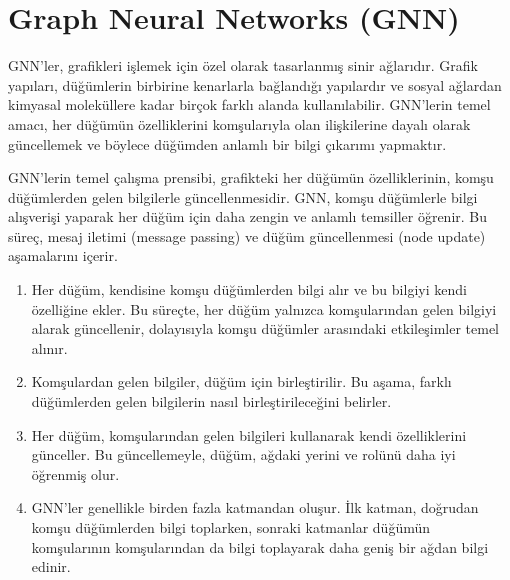 \section{Graph Neural Networks (GNN)}

GNN’ler, grafikleri işlemek için özel olarak tasarlanmış sinir ağlarıdır. Grafik yapıları, düğümlerin birbirine kenarlarla bağlandığı yapılardır ve sosyal ağlardan kimyasal moleküllere kadar birçok farklı alanda kullanılabilir. GNN’lerin temel amacı, her düğümün özelliklerini komşularıyla olan ilişkilerine dayalı olarak güncellemek ve böylece düğümden anlamlı bir bilgi çıkarımı yapmaktır.

GNN'lerin temel çalışma prensibi, grafikteki her düğümün özelliklerinin, komşu düğümlerden gelen bilgilerle güncellenmesidir. GNN, komşu düğümlerle bilgi alışverişi yaparak her düğüm için daha zengin ve anlamlı temsiller öğrenir. Bu süreç, mesaj iletimi (message passing) ve düğüm güncellenmesi (node update) aşamalarını içerir.

\begin{enumerate}
    \item Her düğüm, kendisine komşu düğümlerden bilgi alır ve bu bilgiyi kendi özelliğine ekler. Bu süreçte, her düğüm yalnızca komşularından gelen bilgiyi alarak güncellenir, dolayısıyla komşu düğümler arasındaki etkileşimler temel alınır.
    \item Komşulardan gelen bilgiler, düğüm için birleştirilir. Bu aşama, farklı düğümlerden gelen bilgilerin nasıl birleştirileceğini belirler.
    \item Her düğüm, komşularından gelen bilgileri kullanarak kendi özelliklerini günceller. Bu güncellemeyle, düğüm, ağdaki yerini ve rolünü daha iyi öğrenmiş olur.
    \item GNN’ler genellikle birden fazla katmandan oluşur. İlk katman, doğrudan komşu düğümlerden bilgi toplarken, sonraki katmanlar düğümün komşularının komşularından da bilgi toplayarak daha geniş bir ağdan bilgi edinir.
\end{enumerate}

\newpage